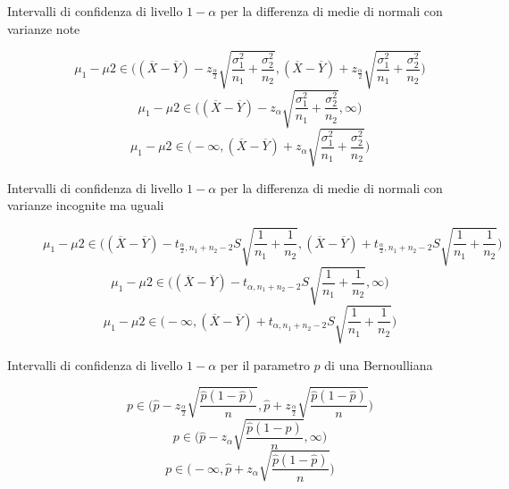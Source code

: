 \begin{description}
	\item[Intervalli di confidenza di livello $1-\alpha$ per la differenza di medie di normali con varianze note]
	\begin{equation}
	\mu_{1}-\mu{2} \in \Big((\overline{X}-\overline{Y})-z_{\frac{\alpha}{2}}\sqrt{\frac{\sigma^{2}_{1}}{n_{1}}+\frac{\sigma^{2}_{2}}{n_{2}}},(\overline{X}-\overline{Y})+z_{\frac{\alpha}{2}}\sqrt{\frac{\sigma^{2}_{1}}{n_{1}}+\frac{\sigma^{2}_{2}}{n_{2}}}\Big)
	\end{equation}
	\begin{equation}
	\mu_{1}-\mu{2} \in \Big((\overline{X}-\overline{Y})-z_{\alpha}\sqrt{\frac{\sigma^{2}_{1}}{n_{1}}+\frac{\sigma^{2}_{2}}{n_{2}}},\infty\Big)
	\end{equation}
	\begin{equation}
	\mu_{1}-\mu{2} \in \Big(-\infty,(\overline{X}-\overline{Y})+z_{\alpha}\sqrt{\frac{\sigma^{2}_{1}}{n_{1}}+\frac{\sigma^{2}_{2}}{n_{2}}}\Big)
	\end{equation}
	
	\item[Intervalli di confidenza di livello $1-\alpha$ per la differenza di medie di normali con varianze incognite ma uguali]
	\begin{equation}
	\mu_{1}-\mu{2} \in \Big((\overline{X}-\overline{Y})-t_{\frac{\alpha}{2},n_{1}+n_{2}-2}S\sqrt{\frac{1}{n_{1}}+\frac{1}{n_{2}}},(\overline{X}-\overline{Y})+t_{\frac{\alpha}{2},n_{1}+n_{2}-2}S\sqrt{\frac{1}{n_{1}}+\frac{1}{n_{2}}}\Big)
	\end{equation}
	\begin{equation}
	\mu_{1}-\mu{2} \in \Big((\overline{X}-\overline{Y})-t_{\alpha,n_{1}+n_{2}-2}S\sqrt{\frac{1}{n_{1}}+\frac{1}{n_{2}}},\infty\Big)
	\end{equation}
	\begin{equation}
	\mu_{1}-\mu{2} \in \Big(-\infty,(\overline{X}-\overline{Y})+t_{\alpha,n_{1}+n_{2}-2}S\sqrt{\frac{1}{n_{1}}+\frac{1}{n_{2}}}\Big)
	\end{equation}
	
	\item[Intervalli di confidenza di livello $1-\alpha$ per il parametro $p$ di una Bernoulliana]
	\begin{equation}
	p \in \Big(\hat{p}-z_{\frac{\alpha}{2}}\sqrt{\frac{\hat{p}(1-\hat{p})}{n}},\hat{p}+z_{\frac{\alpha}{2}}\sqrt{\frac{\hat{p}(1-\hat{p})}{n}}\Big)
	\end{equation}
	\begin{equation}
	p \in \Big(\hat{p}-z_{\alpha}\sqrt{\frac{\hat{p}(1-\hat{p})}{n}},\infty\Big)
	\end{equation}
	\begin{equation}
	p \in \Big(-\infty,\hat{p}+z_{\alpha}\sqrt{\frac{\hat{p}(1-\hat{p})}{n}}\Big)
	\end{equation}
	

\end{description}
